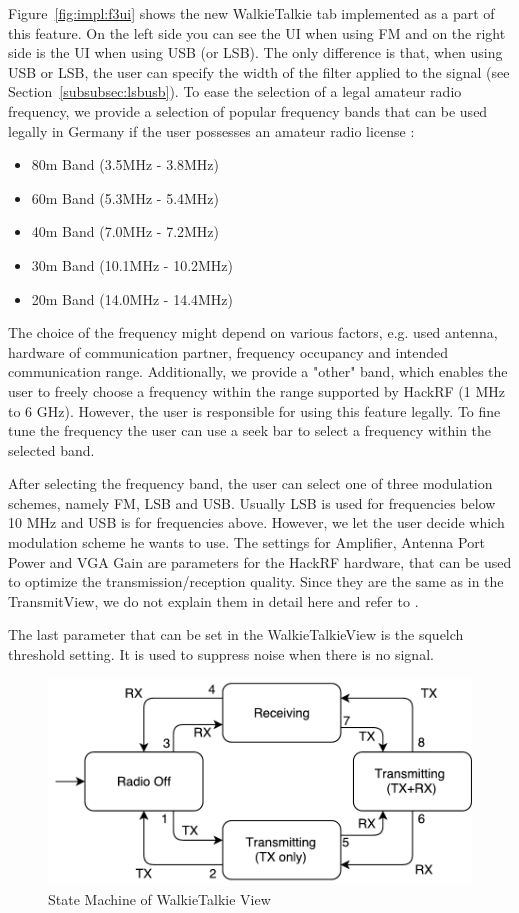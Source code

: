 Figure~\ref{fig:impl:f3ui} shows the new WalkieTalkie tab implemented as a part of this feature. On the left side you can see the UI when using FM and on the right side is the UI when using USB (or LSB). The only difference is that, when using USB or LSB, the user can specify the width of the filter applied to the signal (see Section~\ref{subsubsec:lsbusb}). To ease the selection of a legal amateur radio frequency, we provide a selection of popular frequency bands that can be used legally in Germany if the user possesses an amateur radio license \cite{afuv}: 
\begin{itemize}
	\item 80m Band (3.5MHz - 3.8MHz)
	\item 60m Band (5.3MHz - 5.4MHz)
	\item 40m Band (7.0MHz - 7.2MHz)
	\item 30m Band (10.1MHz - 10.2MHz)
	\item 20m Band (14.0MHz - 14.4MHz)
\end{itemize}

The choice of the frequency might depend on various factors, e.g. used antenna, hardware of communication partner, frequency occupancy and intended communication range. 
Additionally, we provide a "other" band, which enables the user to freely choose a frequency within the range supported by HackRF (1 MHz to 6 GHz). However, the user is responsible for using this feature legally. To fine tune the frequency the user can use a seek bar to select a frequency within the selected band. 

After selecting the frequency band, the user can select one of three modulation schemes, namely FM, LSB and USB. Usually LSB is used for frequencies below 10 MHz and USB is for frequencies above. However, we let the user decide which modulation scheme he wants to use.
The settings for Amplifier, Antenna Port Power and VGA Gain are parameters for the HackRF hardware, that can be used to optimize the transmission/reception quality. Since they are the same as in the TransmitView, we do not explain them in detail here and refer to \cite{Mantz2016}. 

The last parameter that can be set in the WalkieTalkieView is the squelch threshold setting. It is used to suppress noise when there is no signal. 
\begin{figure}
	\centering
	\includegraphics[width=0.8\linewidth]{gfx/walkietalkieview_fsm.pdf}
	\caption{State Machine of WalkieTalkie View}
	\label{fig:impl:f3fsa}
\end{figure}

